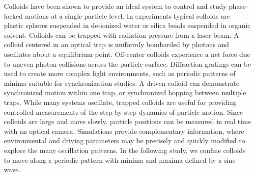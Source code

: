 \documentclass[preprint,showpacs,preprintnumbers,amsmath,amssymb,aps,prb]{revtex4-1}
\theoremstyle{remark}
\begin{document}
Colloids have been
shown to 
provide an ideal system to 
control and study
phase-locked motions
at a single particle level.\cite{Juniper2015,Juniper2017}
In experiments %
typical colloids are   
plastic spheres suspended in
de-ionized water or silica beads suspended in organic solvent.
Colloids can be trapped
with 
radiation pressure from 
a laser beam.\cite{Ashkin1997} 
A colloid centered in an optical trap is 
uniformly bombarded by photons
and oscillates
about a equilibrium point.
Off-center colloids 
experience a net force
due to uneven photon collisions across
the particle surface.
Diffraction gratings can be used to create
more complex light environments, 
such as periodic patterns of minima
suitable for synchronization studies.\cite{Grier2003}  
A driven colloid
can demonstrate
synchronized
motion within one trap,
or synchronized hopping between multiple traps. 
While many systems oscillate,
trapped colloids are useful for 
providing controlled 
measurements of the
step-by-step dynamics of particle motion.
Since
colloids are large 
and move slowly, 
particle positions 
can be measured in real time 
with an optical camera.\cite{Pertsinidis2001}
Simulations provide complementary
information,
where environmental and driving parameters may be precisely
and quickly modified to explore
the many oscillation patterns.
In the following study,
we confine colloids  
to move along a periodic pattern
with minima and maxima defined by a sine wave.
\end{document}
